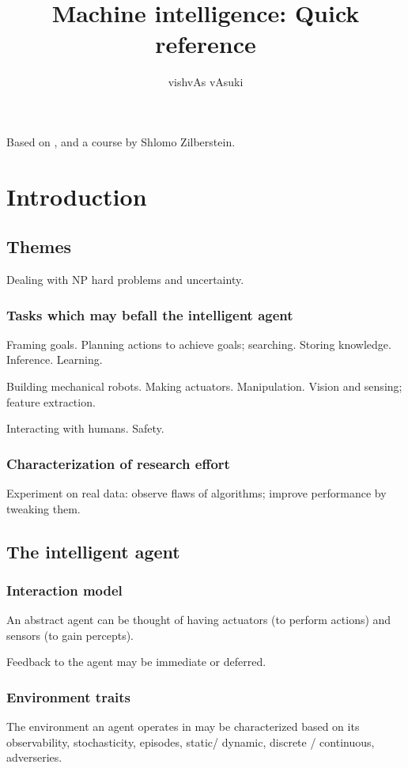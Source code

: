\documentclass[oneside, article]{memoir}
\title{Machine intelligence: Quick reference}
\author{vishvAs vAsuki}
\begin{document}
\maketitle
\tableofcontents

Based on \cite{russellNorvig}, and a course by Shlomo Zilberstein.


\part{Introduction}
\chapter{Themes}
Dealing with NP hard problems and uncertainty.

\section{Tasks which may befall the intelligent agent}
Framing goals. Planning actions to achieve goals; searching. Storing knowledge. Inference. Learning.

Building mechanical robots. Making actuators. Manipulation. Vision and sensing; feature extraction.

Interacting with humans. Safety.

\section{Characterization of research effort}
Experiment on real data: observe flaws of algorithms; improve performance by tweaking them.

\chapter{The intelligent agent}
\section{Interaction model}
An abstract agent can be thought of having actuators (to perform actions) and sensors (to gain percepts).

Feedback to the agent may be immediate or deferred.

\section{Environment traits}
The environment an agent operates in may be characterized based on its observability, stochasticity, episodes, static/ dynamic, discrete / continuous, adverseries.
\end{document}
